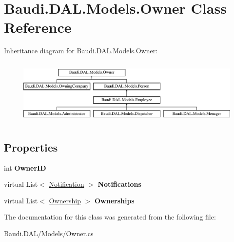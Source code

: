 \hypertarget{class_baudi_1_1_d_a_l_1_1_models_1_1_owner}{}\section{Baudi.\+D\+A\+L.\+Models.\+Owner Class Reference}
\label{class_baudi_1_1_d_a_l_1_1_models_1_1_owner}
Inheritance diagram for Baudi.\+D\+A\+L.\+Models.\+Owner\+:\begin{figure}[H]
\begin{center}
\leavevmode
\includegraphics[height=3.303835cm]{class_baudi_1_1_d_a_l_1_1_models_1_1_owner}
\end{center}
\end{figure}
\subsection*{Properties}
\begin{DoxyCompactItemize}
\item 
\hypertarget{class_baudi_1_1_d_a_l_1_1_models_1_1_owner_a9a0de681975ee741d4aa8f68df3bb0a4}{}int {\bfseries Owner\+I\+D}\label{class_baudi_1_1_d_a_l_1_1_models_1_1_owner_a9a0de681975ee741d4aa8f68df3bb0a4}

\item 
\hypertarget{class_baudi_1_1_d_a_l_1_1_models_1_1_owner_a0495821ab1e2971a6b0dfa1e834191b7}{}virtual List$<$ \hyperlink{class_baudi_1_1_d_a_l_1_1_models_1_1_notification}{Notification} $>$ {\bfseries Notifications}\label{class_baudi_1_1_d_a_l_1_1_models_1_1_owner_a0495821ab1e2971a6b0dfa1e834191b7}

\item 
\hypertarget{class_baudi_1_1_d_a_l_1_1_models_1_1_owner_a570baaba5955ffc2bc3b12eccc6b75b3}{}virtual List$<$ \hyperlink{class_baudi_1_1_d_a_l_1_1_models_1_1_ownership}{Ownership} $>$ {\bfseries Ownerships}\label{class_baudi_1_1_d_a_l_1_1_models_1_1_owner_a570baaba5955ffc2bc3b12eccc6b75b3}

\end{DoxyCompactItemize}


The documentation for this class was generated from the following file\+:\begin{DoxyCompactItemize}
\item 
Baudi.\+D\+A\+L/\+Models/Owner.\+cs\end{DoxyCompactItemize}
